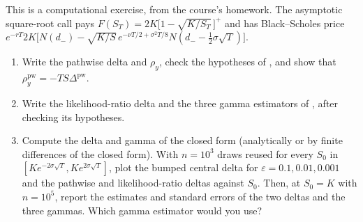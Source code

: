 \begin{exercise}\label{ex:gr-asc}
\medium This is a computational exercise, from the course's homework. The asymptotic
square-root call pays $F(S_T)=2K\big[1-\sqrt{K/S_T}\,\big]^+$ and has Black--Scholes price
$e^{-rT}2K\big[N(d_-)-\sqrt{K/S}\,e^{-\nu T/2+\sigma^2T/8}N(d_--\frac12\sigma\sqrt T)\big]$.
\begin{enumerate}[label=(\alph*)]
  \item Write the pathwise delta and $\rho_y$, check the hypotheses of
    , and show that $\rho_y^{\mathrm{pw}}=-TS\Delta^{\mathrm{pw}}$.
  \item Write the likelihood-ratio delta and the three gamma estimators of
    , after checking its hypotheses.
  \item Compute the delta and gamma of the closed form (analytically or by finite differences of
    the closed form). With $n=10^3$ draws reused for every $S_0$ in
    $[Ke^{-2\sigma\sqrt T},Ke^{2\sigma\sqrt T}]$, plot the bumped central delta for
    $\varepsilon=0.1,0.01,0.001$ and the pathwise and likelihood-ratio deltas against $S_0$. Then,
    at $S_0=K$ with $n=10^5$, report the estimates and standard errors of the two deltas and the
    three gammas. Which gamma estimator would you use?
\end{enumerate}
\end{exercise}

